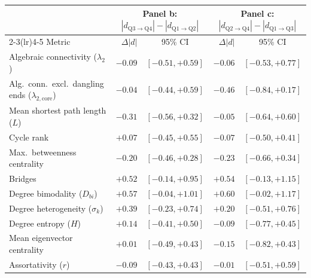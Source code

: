 \begin{tabular}{lrcrc}
\toprule
 & \multicolumn{2}{c}{Panel b: $|d_{\mathrm{Q3\to Q4}}|-|d_{\mathrm{Q1\to Q2}}|$} & \multicolumn{2}{c}{Panel c: $|d_{\mathrm{Q2\to Q4}}|-|d_{\mathrm{Q1\to Q3}}|$} \\
\cmidrule(lr){2-3}\cmidrule(lr){4-5}
Metric & $\Delta|d|$ & 95\% CI & $\Delta|d|$ & 95\% CI \\
\midrule
Algebraic connectivity ($\lambda_2$) & $-0.09$ & $[-0.51, +0.59]$ & $-0.06$ & $[-0.53, +0.77]$ \\
Alg.\ conn.\ excl.\ dangling ends ($\lambda_{2,\mathrm{core}}$) & $-0.04$ & $[-0.44, +0.59]$ & $-0.46$ & $[-0.84, +0.17]$ \\
Mean shortest path length ($L$) & $-0.31$ & $[-0.56, +0.32]$ & $-0.05$ & $[-0.64, +0.60]$ \\
Cycle rank & $+0.07$ & $[-0.45, +0.55]$ & $-0.07$ & $[-0.50, +0.41]$ \\
Max.\ betweenness centrality & $-0.20$ & $[-0.46, +0.28]$ & $-0.23$ & $[-0.66, +0.34]$ \\
Bridges & $+0.52$ & $[-0.14, +0.95]$ & $+0.54$ & $[-0.13, +1.15]$ \\
Degree bimodality ($D_{bi}$) & $+0.57$ & $[-0.04, +1.01]$ & $+0.60$ & $[-0.02, +1.17]$ \\
Degree heterogeneity ($\sigma_k$) & $+0.39$ & $[-0.23, +0.74]$ & $+0.20$ & $[-0.51, +0.76]$ \\
Degree entropy ($H$) & $+0.14$ & $[-0.41, +0.50]$ & $-0.09$ & $[-0.77, +0.45]$ \\
Mean eigenvector centrality & $+0.01$ & $[-0.49, +0.43]$ & $-0.15$ & $[-0.82, +0.43]$ \\
Assortativity ($r$) & $-0.09$ & $[-0.43, +0.43]$ & $-0.01$ & $[-0.51, +0.59]$ \\
\bottomrule
\end{tabular}
